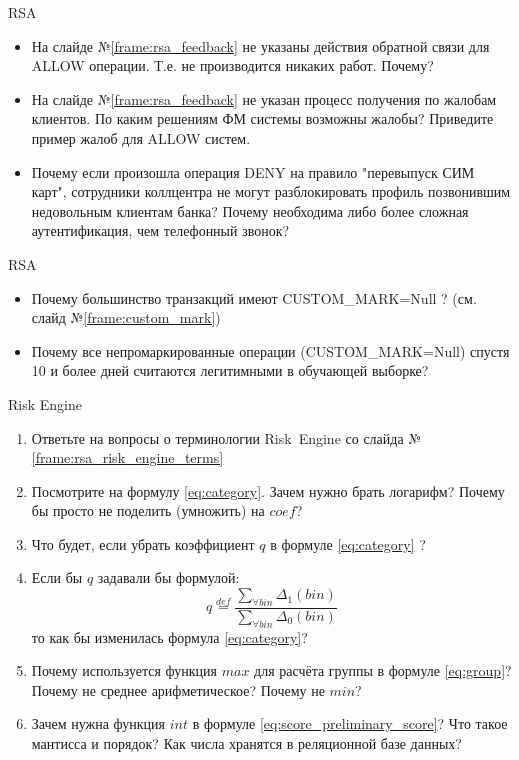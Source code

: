 \begin{frame}{RSA}
	\begin{itemize}
		\item На слайде №\ref{frame:rsa_feedback} не указаны действия
		обратной связи для ALLOW операции. Т.е. не производится никаких работ. 
		Почему?
		\item На слайде №\ref{frame:rsa_feedback} не указан процесс получения 
		по жалобам клиентов. По каким решениям ФМ системы возможны жалобы? 
		Приведите пример жалоб для ALLOW систем. 
		\item Почему если произошла операция DENY на правило "перевыпуск СИМ карт", 
		сотрудники коллцентра не могут разблокировать профиль позвонившим
		недовольным клиентам банка? Почему необходима либо более сложная аутентификация, чем 
		телефонный звонок?
	\end{itemize}
\end{frame}

\begin{frame}{RSA}
\begin{itemize}
	\item Почему большинство транзакций имеют CUSTOM\_MARK=Null ?
	(см. слайд №\ref{frame:custom_mark})
	\item Почему все непромаркированные операции (CUSTOM\_MARK=Null) спустя 10 и более дней считаются 
	легитимными в обучающей выборке?
\end{itemize}
\end{frame}

\begin{frame}{Risk Engine}
	\small
	\begin{enumerate}
		\item 	Ответьте на вопросы о терминологии \mbox{Risk Engine}
		со слайда №\ref{frame:rsa_risk_engine_terms}
		\item Посмотрите на формулу \eqref{eq:category}. Зачем нужно брать логарифм?
		Почему бы просто не поделить (умножить) на $coef$?  
		\item Что будет, если убрать коэффициент $q$ в формуле \eqref{eq:category} ?
		\item Если бы $q$ задавали бы формулой:
		\begin{equation*}
		q \stackrel{def}{=} \frac{\sum_{\forall bin} \Delta_1(bin)}{\sum_{\forall bin} \Delta_0(bin)}
		\end{equation*}
		то как бы изменилась формула \eqref{eq:category}?
		\item Почему используется функция $max$ для расчёта группы в формуле \eqref{eq:group}?
		Почему не среднее арифметическое? Почему не $min$?
		\item Зачем нужна функция $int$ в формуле \eqref{eq:score_preliminary_score}? Что 
		такое мантисса и порядок? Как числа хранятся в реляционной базе данных?
		
	\end{enumerate}
\end{frame}

